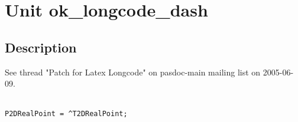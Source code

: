 \documentclass{report}
\begin{document}
\newlength{\tmplength}
\chapter{Unit ok{\_}longcode{\_}dash}
\section{Description}
See thread "Patch for Latex Longcode" on pasdoc{-}main mailing list on 2005{-}06{-}09.

\texttt{\\\nopagebreak[3]
P2DRealPoint~=~{\^{}}T2DRealPoint;\\
}
\end{document}
